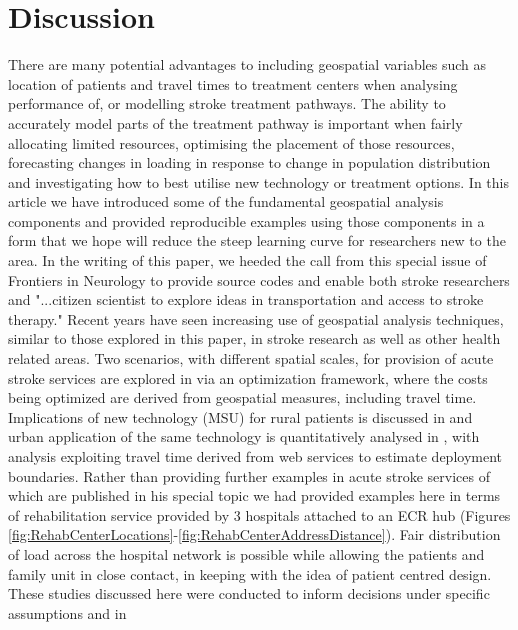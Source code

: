 \documentclass[utf8]{frontiersHLTH}
\begin{document}
\section{Discussion}\label{discussion} 
There are many potential advantages to including geospatial variables
such as location of patients and travel times to treatment centers
when analysing performance of, or modelling stroke treatment
pathways. The ability to accurately model parts of the treatment
pathway is important when fairly allocating limited resources,
optimising the placement of those resources, forecasting changes in
loading in response to change in population distribution and
investigating how to best utilise new technology or treatment
options. In this article we have introduced some of the fundamental
geospatial analysis components and provided reproducible examples
using those components in a form that we hope will reduce the steep
learning curve for researchers new to the area. In the writing of this
paper, we heeded the call from this special issue of Frontiers in
Neurology to provide source codes and enable both stroke researchers
and "...citizen scientist to explore ideas in transportation and
access to stroke therapy." Recent years have seen increasing use of
geospatial analysis techniques, similar to those explored in this
paper, in stroke research as well as other health related areas. Two
scenarios, with different spatial scales, for provision of acute
stroke services are explored in \cite{10.3389/fneur.2019.00150} via an
optimization framework, where the costs being optimized are derived
from geospatial measures, including travel time. Implications of new
technology (MSU) for rural patients is discussed in
\cite{10.3389/fneur.2019.00159} and urban application of the same
technology is quantitatively analysed in
\cite{10.3389/fneur.2019.00331}, with analysis exploiting travel time
derived from web services to estimate deployment boundaries. Rather
than providing further examples in acute stroke services of which are
published in his special topic \cite{10.3389/fneur.2019.00150,
  10.3389/fneur.2019.00159, 10.3389/fneur.2019.00331} we had provided
examples here in terms of rehabilitation service provided by 3
hospitals attached to an ECR hub (Figures
\ref{fig:RehabCenterLocations}-\ref{fig:RehabCenterAddressDistance}). Fair
distribution of load across the hospital network is possible while
allowing the patients and family unit in close contact, in keeping
with the idea of patient centred design. These studies discussed here
were conducted to inform decisions under specific assumptions and in
\end{document}
